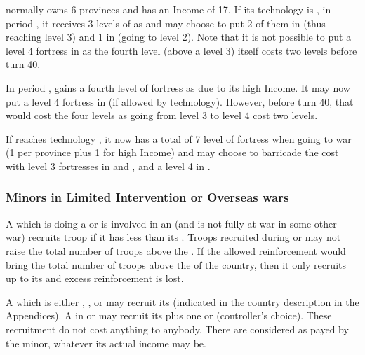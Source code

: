 \begin{exemple}[Fortresses]
  \paysAlgerie normally owns 6 provinces and has an Income of 17. If its
  technology is \TBAR, in period , it receives 3 levels of
  \fortress as  and may choose to put 2 of them in
  \provinceAlgerie (thus reaching level 3) and 1 in \provinceOran (going to
  level 2). Note that it is not possible to put a level 4 fortress in
  \provinceAlgerie as the fourth level (above a level 3) itself costs two
  levels before turn 40.

  In period , \paysAlgerie gains a fourth level of fortress as
   due to its high Income. It may now put a level 4
  fortress in \provinceAlgerie (if allowed by technology). However, before
  turn 40, that would cost the four levels as going from level 3 to level 4
  cost two levels.

  If \paysAlgerie reaches technology \TMAN, it now has a total of 7 level of
  fortress when going to war (1 per province plus 1 for high Income) and may
  choose to barricade the cost with level 3 fortresses in \provinceOran and
  \provinceAnnabah, and a level 4 in \provinceAlgerie.
\end{exemple}

\subsubsection{Minors in Limited Intervention or Overseas wars}
\bparag A \MIN which is doing a  or is involved in
an  (and is not fully at war in some other war) recruits
troop if it has less than its .
\bparag Troops recruited during  or
 may not raise the total number of troops above the
.
\bparag If the allowed reinforcement would bring the total number of troops
above the  of the country, then it only recruits up to its
 and excess reinforcement is lost.

\bparag A \MIN which is either \Neutral, \RM, \SUB or \MA may recruit its
 (indicated in the country description in the
Appendices).
\bparag A \MIN in \CE or \EW may recruit its  plus
one \LD or \ND (controller's choice).
\bparag These recruitment do not cost anything to anybody. There are
considered as payed by the minor, whatever its actual income may be.

